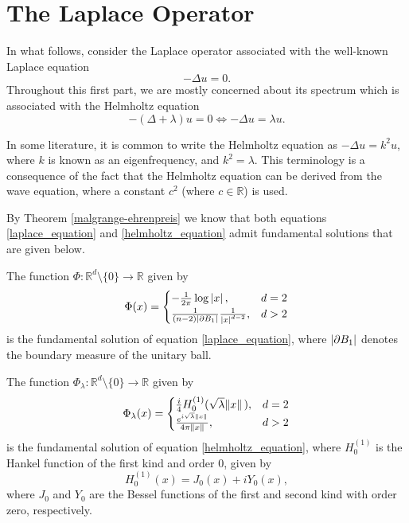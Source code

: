 \section{The Laplace Operator}
\label{section:laplace_op}

In what follows, consider the Laplace operator associated with the well-known Laplace equation
\begin{equation} \label{laplace_equation}
    -\Delta u = 0.
\end{equation}
Throughout this first part, we are mostly concerned about its spectrum which is associated with the Helmholtz equation
\begin{equation} \label{helmholtz_equation}
    -(\Delta+\lambda) u = 0 \iff -\Delta u = \lambda u.
\end{equation}

\begin{remark}
    In some literature, it is common to write the Helmholtz equation as \(-\Delta u = k^2 u\), where \(k\) is known as an eigenfrequency, and \(k^2 = \lambda\). This terminology is a consequence of the fact that the Helmholtz equation can be derived from the wave equation, where a constant \(c^2\) (where \(c \in \mathbb{R}\)) is used.
\end{remark}

By Theorem \ref{malgrange-ehrenpreis} we know that both equations \eqref{laplace_equation} and \eqref{helmholtz_equation} admit fundamental solutions that are given below.

\begin{proposition}
    The function \(\Phi: \mathbb{R}^d \setminus \{0\} \rightarrow \mathbb{R}\) given by
    \[
    \Phi(x) = \begin{cases}
        -\frac{1}{2 \pi} \log \abs*{x}, & d=2\\
        \frac{1}{(n-2)\abs{\partial B_1}}\frac{1}{\abs*{x}^{d-2}}, & d > 2
    \end{cases}    
    \]
    is the fundamental solution of equation \eqref{laplace_equation}, where \(\abs{\partial B_1}\) denotes the boundary measure of the unitary ball.
\end{proposition}
\begin{proposition}\label{helm_fund_sol}
    The function \(\Phi_\lambda: \mathbb{R}^d \setminus \{0\} \rightarrow \mathbb{R}\) given by
    \[
    \Phi_\lambda(x) = \begin{cases}
        \frac{i}{4} H_0^{(1)}(\sqrt{\lambda} \norm*{x}), & d=2\\
        \frac{e^{i \sqrt{\lambda} \norm*{x}}}{4 \pi \norm*{x}}, & d > 2
    \end{cases}    
    \]
    is the fundamental solution of equation \eqref{helmholtz_equation}, where \(H_0^{(1)}\) is the Hankel function of the first kind and order 0, given by
    \[
        H_0^{(1)}(x) = J_0(x) + i Y_0(x),
    \]
    where \(J_0\) and \(Y_0\) are the Bessel functions of the first and second kind with order zero, respectively.
\end{proposition}

